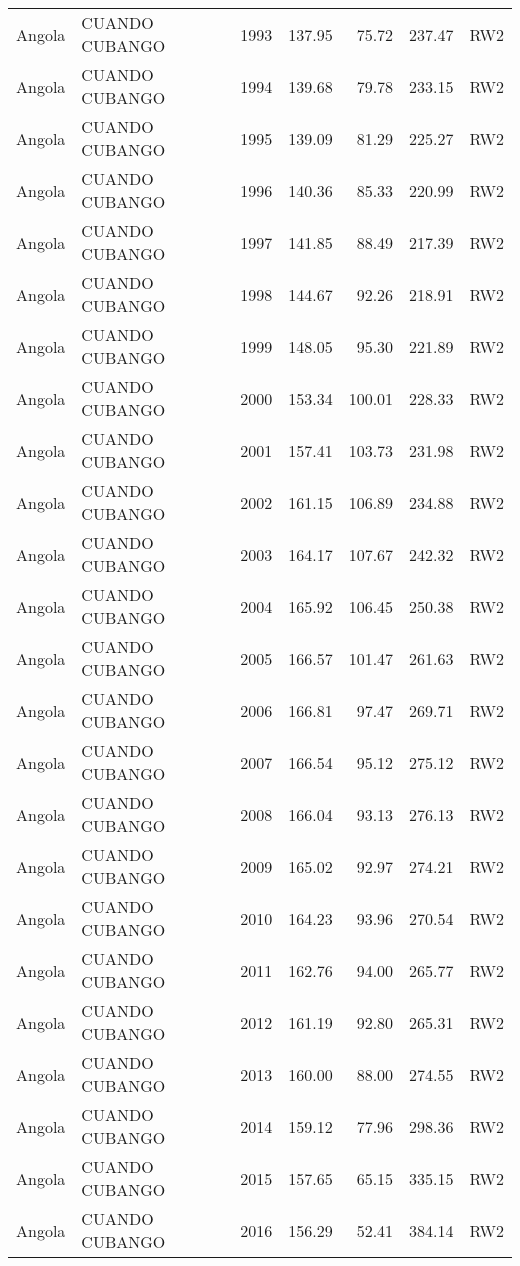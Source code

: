 \begin{longtable}{lllrrrl}
  Angola & CUANDO CUBANGO & 1993 & 137.95 & 75.72 & 237.47 & RW2 \\ 
  Angola & CUANDO CUBANGO & 1994 & 139.68 & 79.78 & 233.15 & RW2 \\ 
  Angola & CUANDO CUBANGO & 1995 & 139.09 & 81.29 & 225.27 & RW2 \\ 
  Angola & CUANDO CUBANGO & 1996 & 140.36 & 85.33 & 220.99 & RW2 \\ 
  Angola & CUANDO CUBANGO & 1997 & 141.85 & 88.49 & 217.39 & RW2 \\ 
  Angola & CUANDO CUBANGO & 1998 & 144.67 & 92.26 & 218.91 & RW2 \\ 
  Angola & CUANDO CUBANGO & 1999 & 148.05 & 95.30 & 221.89 & RW2 \\ 
  Angola & CUANDO CUBANGO & 2000 & 153.34 & 100.01 & 228.33 & RW2 \\ 
  Angola & CUANDO CUBANGO & 2001 & 157.41 & 103.73 & 231.98 & RW2 \\ 
  Angola & CUANDO CUBANGO & 2002 & 161.15 & 106.89 & 234.88 & RW2 \\ 
  Angola & CUANDO CUBANGO & 2003 & 164.17 & 107.67 & 242.32 & RW2 \\ 
  Angola & CUANDO CUBANGO & 2004 & 165.92 & 106.45 & 250.38 & RW2 \\ 
  Angola & CUANDO CUBANGO & 2005 & 166.57 & 101.47 & 261.63 & RW2 \\ 
  Angola & CUANDO CUBANGO & 2006 & 166.81 & 97.47 & 269.71 & RW2 \\ 
  Angola & CUANDO CUBANGO & 2007 & 166.54 & 95.12 & 275.12 & RW2 \\ 
  Angola & CUANDO CUBANGO & 2008 & 166.04 & 93.13 & 276.13 & RW2 \\ 
  Angola & CUANDO CUBANGO & 2009 & 165.02 & 92.97 & 274.21 & RW2 \\ 
  Angola & CUANDO CUBANGO & 2010 & 164.23 & 93.96 & 270.54 & RW2 \\ 
  Angola & CUANDO CUBANGO & 2011 & 162.76 & 94.00 & 265.77 & RW2 \\ 
  Angola & CUANDO CUBANGO & 2012 & 161.19 & 92.80 & 265.31 & RW2 \\ 
  Angola & CUANDO CUBANGO & 2013 & 160.00 & 88.00 & 274.55 & RW2 \\ 
  Angola & CUANDO CUBANGO & 2014 & 159.12 & 77.96 & 298.36 & RW2 \\ 
  Angola & CUANDO CUBANGO & 2015 & 157.65 & 65.15 & 335.15 & RW2 \\ 
  Angola & CUANDO CUBANGO & 2016 & 156.29 & 52.41 & 384.14 & RW2 \\ 

\end{longtable}
